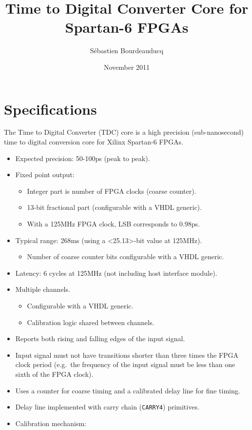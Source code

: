 \documentclass[a4paper,11pt]{article}
\title{Time to Digital Converter Core for Spartan-6 FPGAs}
\author{S\'ebastien Bourdeauducq}
\date{November 2011}
\begin{document}
\setlength{\parindent}{0pt}
\setlength{\parskip}{5pt}
\maketitle{}
\section{Specifications}
The Time to Digital Converter (TDC) core is a high precision (sub-nanosecond) time to digital conversion core for Xilinx Spartan-6 FPGAs.

\begin{itemize}
\item Expected precision: 50-100ps (peak to peak).
\item Fixed point output:
\begin{itemize}
\item Integer part is number of FPGA clocks (coarse counter).
\item 13-bit fractional part (configurable with a VHDL generic).
\item With a 125MHz FPGA clock, LSB corresponds to 0.98ps.
\end{itemize}
\item Typical range: 268ms (using a <25.13>-bit value at 125MHz).
\begin{itemize}
\item Number of coarse counter bits configurable with a VHDL generic.
\end{itemize}
\item Latency: 6 cycles at 125MHz (not including host interface module).
\item Multiple channels.
\begin{itemize}
\item Configurable with a VHDL generic.
\item Calibration logic shared between channels.
\end{itemize}
\item Reports both rising and falling edges of the input signal.
\item Input signal must not have transitions shorter than three times the FPGA clock period (e.g.\ the frequency of the input signal must be less than one sixth of the FPGA clock).
\item Uses a counter for coarse timing and a calibrated delay line for fine timing.
\item Delay line implemented with carry chain (\verb!CARRY4!) primitives.
\item Calibration mechanism:

\end{itemize}
\end{document}
